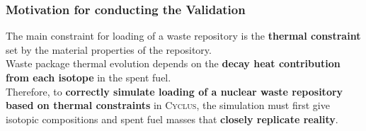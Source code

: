 \begin{frame}
    \frametitle{Motivation for conducting the Validation}
    The main constraint for loading of a waste repository is the \textbf{thermal constraint} set by the material properties of the repository. 
    \\
    
    Waste package thermal evolution depends on the \textbf{decay heat contribution from each isotope} in the spent fuel. 
    \\
    
    Therefore, to \textbf{correctly simulate loading of a nuclear waste repository based on thermal constraints} in \textsc{Cyclus}, the simulation must first give isotopic compositions and spent fuel masses that \textbf{closely replicate reality}. 

  \end{frame}
  